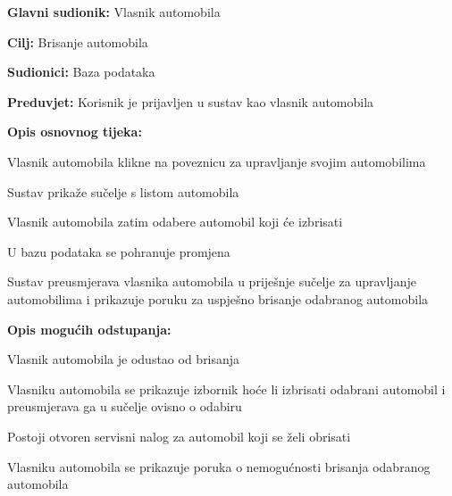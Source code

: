 \noindent {}
\begin{packed_item}
	
	\item \textbf{Glavni sudionik: } Vlasnik automobila
	\item  \textbf{Cilj:} Brisanje automobila
	\item  \textbf{Sudionici:} Baza podataka
	\item  \textbf{Preduvjet:} Korisnik je prijavljen u sustav kao vlasnik automobila
	\item  \textbf{Opis osnovnog tijeka:}
	
	\item[] \begin{packed_enum}
		
		\item Vlasnik automobila klikne na poveznicu za upravljanje svojim automobilima
		\item Sustav prikaže sučelje s listom automobila
		\item Vlasnik automobila zatim odabere automobil koji će izbrisati
		\item U bazu podataka se pohranuje promjena
		\item Sustav preusmjerava vlasnika automobila u priješnje sučelje za upravljanje
		automobilima i prikazuje poruku za uspješno brisanje odabranog automobila
		
	\end{packed_enum}
	\item  \textbf{Opis mogućih odstupanja:}
	
	\item[] \begin{packed_item}
		
		\item[3.a] Vlasnik automobila je odustao od brisanja
		\item[] \begin{packed_enum}
			
			\item Vlasniku automobila se prikazuje izbornik hoće li izbrisati odabrani
			automobil i preusmjerava ga u sučelje ovisno o odabiru
			
		\end{packed_enum}
		
		\item[3.b] Postoji otvoren servisni nalog za automobil koji se želi
		obrisati
		\item[] \begin{packed_enum}
			
			\item Vlasniku automobila se prikazuje poruka o nemogućnosti brisanja odabranog
			automobila
			
		\end{packed_enum}
		
	\end{packed_item}
	
\end{packed_item}
